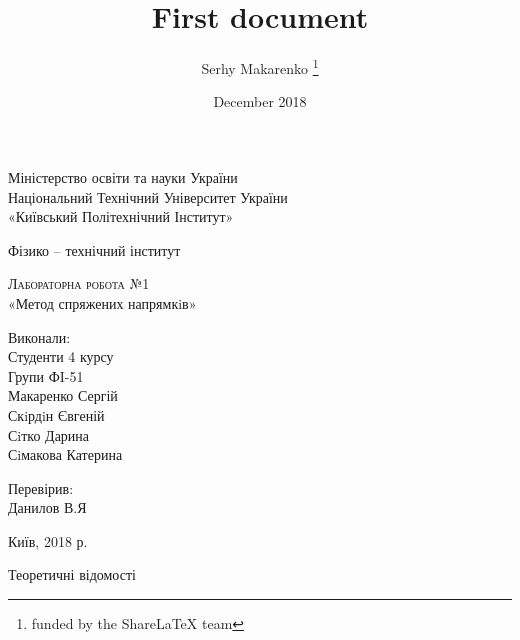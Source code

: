 \documentclass[12pt, letterpaper, twoside]{article}
\title{First document}
\author{Serhy Makarenko \thanks{funded by the ShareLaTeX team}}
\date{December 2018}
\begin{document}
	
\begin{titlepage}
	\begin{center}
		\large



		\vspace{0.5cm}
				Міністерство освіти та науки України\\
		Національний Технічний Університет України\\
		«Київський Політехнічний Інститут»
\\
	
		\vspace{0.25cm}
		
	Фізико – технічний інститут


		\vfill
		
		\textsc{Лабораторна робота №1}\\[5mm]
		
		{\LARGE «Метод спряжених напрямкiв»}
		\bigskip
		
	\end{center}
	\vfill
	
	\newlength{\ML}
	\hfill\begin{minipage}{0.3\textwidth}
		Виконали:\\
		 Студенти 4 курсу\\
		 Групи ФI-51\\
		 Макаренко Сергій\\
		 Скiрдiн Євгеній\\
		 Сiтко Дарина\\
		 Сiмакова Катерина\\
	
	\end{minipage}%
	\bigskip
	
	\hfill\begin{minipage}{0.3\textwidth}
		Перевірив:\\
		Данилов В.Я
	\end{minipage}%
	\vfill
	
	\begin{center}
		Київ, 2018 р.
	\end{center}
\end{titlepage}
	


\begin{center}
	Теоретичні відомості
\end{center}
\end{document}
